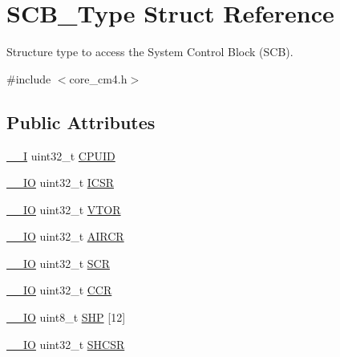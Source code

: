 \hypertarget{struct_s_c_b___type}{}\section{S\+C\+B\+\_\+\+Type Struct Reference}
\label{struct_s_c_b___type}


Structure type to access the System Control Block (S\+CB).  




{\ttfamily \#include $<$core\+\_\+cm4.\+h$>$}

\subsection*{Public Attributes}
\begin{DoxyCompactItemize}
\item 
\hyperlink{core__cm4_8h_af63697ed9952cc71e1225efe205f6cd3}{\+\_\+\+\_\+I} uint32\+\_\+t \hyperlink{struct_s_c_b___type_afa7a9ee34dfa1da0b60b4525da285032}{C\+P\+U\+ID}
\item 
\hyperlink{core__cm4_8h_aec43007d9998a0a0e01faede4133d6be}{\+\_\+\+\_\+\+IO} uint32\+\_\+t \hyperlink{struct_s_c_b___type_a3e66570ab689d28aebefa7e84e85dc4a}{I\+C\+SR}
\item 
\hyperlink{core__cm4_8h_aec43007d9998a0a0e01faede4133d6be}{\+\_\+\+\_\+\+IO} uint32\+\_\+t \hyperlink{struct_s_c_b___type_a0faf96f964931cadfb71cfa54e051f6f}{V\+T\+OR}
\item 
\hyperlink{core__cm4_8h_aec43007d9998a0a0e01faede4133d6be}{\+\_\+\+\_\+\+IO} uint32\+\_\+t \hyperlink{struct_s_c_b___type_a6ed3c9064013343ea9fd0a73a734f29d}{A\+I\+R\+CR}
\item 
\hyperlink{core__cm4_8h_aec43007d9998a0a0e01faede4133d6be}{\+\_\+\+\_\+\+IO} uint32\+\_\+t \hyperlink{struct_s_c_b___type_abfad14e7b4534d73d329819625d77a16}{S\+CR}
\item 
\hyperlink{core__cm4_8h_aec43007d9998a0a0e01faede4133d6be}{\+\_\+\+\_\+\+IO} uint32\+\_\+t \hyperlink{struct_s_c_b___type_a6d273c6b90bad15c91dfbbad0f6e92d8}{C\+CR}
\item 
\hyperlink{core__cm4_8h_aec43007d9998a0a0e01faede4133d6be}{\+\_\+\+\_\+\+IO} uint8\+\_\+t \hyperlink{struct_s_c_b___type_af6336103f8be0cab29de51daed5a65f4}{S\+HP} \mbox{[}12\mbox{]}
\item 
\hyperlink{core__cm4_8h_aec43007d9998a0a0e01faede4133d6be}{\+\_\+\+\_\+\+IO} uint32\+\_\+t \hyperlink{struct_s_c_b___type_ae9891a59abbe51b0b2067ca507ca212f}{S\+H\+C\+SR}
\item 

\end{DoxyCompactItemize}
